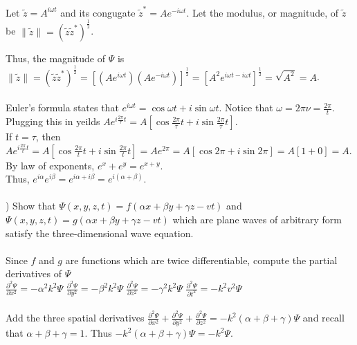 \documentclass[12pt]{article}
\begin{document}
\noindent Let $\tilde{z} = A^{i\omega t}$
\noindent and its congugate $\tilde{z}^{*} = Ae^{-i\omega t}$.
\noindent Let the modulus, or magnitude, of $\tilde{z}$ 
be $\| \tilde{z}\| = (\tilde{z}\tilde{z}^{*})^{\frac{1}{2}}$.

\noindent Thus, the magnitude of $\Psi$ is 
$\| \tilde{z}\| =  (\tilde{z}\tilde{z}^{*})^{\frac{1}{2}} 
= [(Ae^{i\omega t})(Ae^{-i\omega t})]^{\frac{1}{2}}
= [A^{2}e^{i\omega t-i\omega t}]^{\frac{1}{2}}
=\sqrt{A^{2}} = A$.\\\\

\noindent Euler's formula states that $e^{i\omega t} = \cos{\omega t} + i\sin{\omega t}$.
Notice that $\omega = 2\pi\nu = \frac{2\pi}{t}$. Plugging this in yeilds $Ae^{i\frac{2\pi}{\tau}t} = A[\cos{\frac{2\pi}{\tau}t} + i\sin{\frac{2\pi}{\tau}t}]$.\\
If $t = \tau$, then $Ae^{i\frac{2\pi}{t}t} = A[\cos{\frac{2\pi}{t}t} + i\sin{\frac{2\pi}{t}t}]
=Ae^{2\pi} = A[\cos{2\pi} + i\sin{2\pi}] = A[1 + 0] = A$.\\

\noindent By law of exponents, $e^{x} + e^{y} = e^{x+y}$.\\
Thus, $e^{i\alpha}e^{i\beta} = e^{i\alpha + i\beta} = e^{i(\alpha + \beta)}$.\\\\


) Show that $\Psi(x,y,z,t) = f(\alpha x + \beta y + \gamma z - vt)$
and $\Psi(x,y,z,t) = g(\alpha x + \beta y + \gamma z - vt)$ which are plane waves of arbitrary form 
satisfy the three-dimensional wave equation.\\\\

\noindent Since $f$ and $g$ are functions which are twice differentiable, compute the partial 
derivatives of $\Psi$\\

\noindent $\frac{\partial^{2}\Psi}{\partial x^{2}} = -\alpha^{2}k^{2}\Psi$\hspace{50pt}
$\frac{\partial^{2}\Psi}{\partial y^{2}} = -\beta^{2}k^{2}\Psi$\hspace{50pt}
$\frac{\partial^{2}\Psi}{\partial z^{2}} = -\gamma^{2}k^{2}\Psi$\hspace{50pt}
$\frac{\partial^{2}\Psi}{\partial t^{2}} = -k^{2}v^{2}\Psi$\hspace{50pt}\\\\

\noindent Add the three spatial derivatives
$\frac{\partial^{2} \Psi}{\partial x^{2}} + \frac{\partial^{2}\Psi}{\partial y^{2} }
+\frac{\partial ^{2} \Psi}{\partial z^{2}} = -k^{2}(\alpha + \beta + \gamma)\Psi$
and recall that $\alpha + \beta + \gamma = 1$. Thus
$-k^{2}(\alpha + \beta + \gamma)\Psi = -k^{2}\Psi$.\\\\
\end{document}
